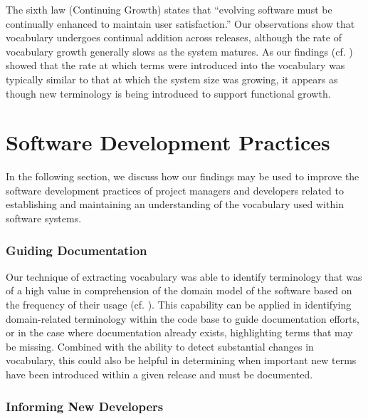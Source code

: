 The sixth law (Continuing Growth) states that ``evolving software must be continually enhanced to maintain user satisfaction.'' Our observations show that vocabulary undergoes continual addition across releases, although the rate of vocabulary growth generally slows as the system matures. As our findings (cf. ) showed that the rate at which terms were introduced into the vocabulary was typically similar to that at which the system size was growing, it appears as though new terminology is being introduced to support functional growth.



\section{Software Development Practices} %
\label{sec:software_development_practices}

In the following section, we discuss how our findings may be used to improve the software development practices of project managers and developers related to establishing and maintaining an understanding of the vocabulary used within software systems.

\subsubsection{Guiding Documentation} %
\label{ssub:guiding_documentation}

Our technique of extracting vocabulary was able to identify terminology that was of a high value in comprehension of the domain model of the software based on the frequency of their usage (cf. ). This capability can be applied in identifying domain-related terminology within the code base to guide documentation efforts, or in the case where documentation already exists, highlighting terms that may be missing. Combined with the ability to detect substantial changes in vocabulary, this could also be helpful in determining when important new terms have been introduced within a given release and must be documented.


\subsubsection{Informing New Developers} %
\label{ssub:informing_new_developers}


